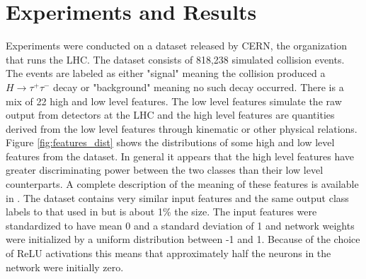 \documentclass[12pt,letterpaper]{article}
\begin{document}
\section{Experiments and Results}

Experiments were conducted on a dataset released by CERN, the organization that runs the LHC.  The dataset consists of 818,238 simulated collision events.  The events are labeled as either "signal" meaning the collision produced a $H \rightarrow \tau^+ \tau^-$ decay or "background" meaning no such decay occurred.  There is a mix of 22 high and low level features.  The low level features simulate the raw output from detectors at the LHC and the high level features are quantities derived from the low level features through kinematic or other physical relations.  Figure \ref{fig:features_dist} shows the distributions of some high and low level features from the dataset.  In general it appears that the high level features have greater discriminating power between the two classes than their low level counterparts.  A complete description of the meaning of these features is available in \cite{pmlr-v42-cowa14}.  The dataset contains very similar input features and the same output class labels to that used in \cite{Baldi:2014pta} but is about 1\% the size.  The input features were standardized to have mean 0 and a standard deviation of 1 and network weights were initialized by a uniform distribution between -1 and 1.  Because of the choice of ReLU activations this means that approximately half the neurons in the network were initially zero.
\end{document}
